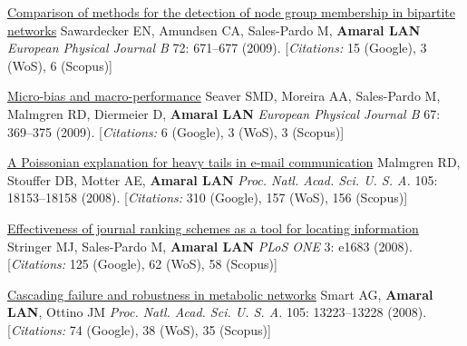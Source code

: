 \NumberedItem{\makebox[0.8cm][r]{[80]}}
\href{/people/amaral/comparison-of-methods-for-the-detection-of-node-group-membership-in-bipartite-networks}
{Comparison of methods for the detection of node group membership in bipartite networks}
\newline
Sawardecker EN, Amundsen CA, Sales-Pardo M, {\textbf{Amaral LAN}}
\newline
\textit{European Physical Journal B}
    72:
671--677 (2009).
    [{\em{Citations:}} 15 (Google), 3 (WoS), 6 (Scopus)]
\newline
\Gap
~
\Gap

\NumberedItem{\makebox[0.8cm][r]{[79]}}
\href{/people/amaral/micro-bias-and-macro-performance}
{Micro-bias and macro-performance}
\newline
Seaver SMD, Moreira AA, Sales-Pardo M, Malmgren RD, Diermeier D, {\textbf{Amaral LAN}}
\newline
\textit{European Physical Journal B}
    67:
369--375 (2009).
    [{\em{Citations:}} 6 (Google), 3 (WoS), 3 (Scopus)]
\newline
\Gap
~
\Gap

\NumberedItem{\makebox[0.8cm][r]{[78]}}
\href{/people/amaral/a-poissonian-explanation-for-heavy-tails-in-e-mail-communication}
{A Poissonian explanation for heavy tails in e-mail communication}
\newline
Malmgren RD, Stouffer DB, Motter AE, {\textbf{Amaral LAN}}
\newline
\textit{Proc. Natl. Acad. Sci. U. S. A.}
    105:
18153--18158 (2008).
    [{\em{Citations:}} 310 (Google), 157 (WoS), 156 (Scopus)]
\newline
\Gap
~
\Gap

\NumberedItem{\makebox[0.8cm][r]{[77]}}
\href{/people/amaral/effectiveness-journal-ranking-schemes-as-tool-for-locating-information}
{Effectiveness of journal ranking schemes as a tool for locating information}
\newline
Stringer MJ, Sales-Pardo M, {\textbf{Amaral LAN}}
\newline
\textit{PLoS ONE}
    3:
e1683 (2008).
    [{\em{Citations:}} 125 (Google), 62 (WoS), 58 (Scopus)]
\newline
\Gap
~
\Gap

\NumberedItem{\makebox[0.8cm][r]{[76]}}
\href{/people/amaral/cascading-failure-and-robustness-in-metabolic-networks}
{Cascading failure and robustness in metabolic networks}
\newline
Smart AG, {\textbf{Amaral LAN}}, Ottino JM
\newline
\textit{Proc. Natl. Acad. Sci. U. S. A.}
    105:
13223--13228 (2008).
    [{\em{Citations:}} 74 (Google), 38 (WoS), 35 (Scopus)]
\newline
\Gap
~
\Gap


